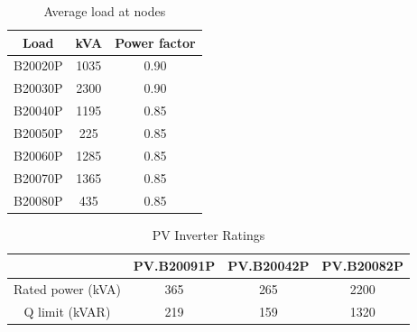 
\begin{table}[!h]
\caption{Average load at nodes}
\label{tab:load_data}
\centering
\begin{tabular}{|c|c|c|}
\hline
Load & kVA & Power factor \\ \hline
B20020P & 1035 & 0.90 \\ \hline
B20030P & 2300 & 0.90 \\ \hline
B20040P & 1195 & 0.85 \\ \hline
B20050P & 225 & 0.85 \\ \hline
B20060P & 1285 & 0.85 \\ \hline
B20070P & 1365 & 0.85 \\ \hline
B20080P & 435 & 0.85 \\ \hline
\end{tabular}
\end{table}


\begin{table}[!h]
\centering
\caption{PV Inverter Ratings}
\label{tab:Inv_rate}
\begin{tabular}{c|c|c|c|}
\cline{2-4}
 & PV.B20091P & PV.B20042P & PV.B20082P \\ \hline
\multicolumn{1}{|c|}{Rated power (kVA)} & 365 & 265 & 2200 \\ \hline
\multicolumn{1}{|c|}{Q limit (kVAR)} & 219 & 159 & 1320 \\ \hline
\end{tabular}
\end{table}